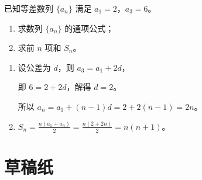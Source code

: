 \documentclass{exam-zh}
\begin{document}
\begin{problem}[points = 10]
  已知等差数列 $\{a_n\}$ 满足 $a_1 = 2$，$a_3 = 6$。

  \begin{enumerate}
    \item 求数列 $\{a_n\}$ 的通项公式；
    \item 求前 $n$ 项和 $S_n$。
  \end{enumerate}

  \begin{solution}
    \begin{enumerate}
      \item 设公差为 $d$，则 $a_3 = a_1 + 2d$，

      即 $6 = 2 + 2d$，解得 $d = 2$。

      所以 $a_n = a_1 + (n - 1)d = 2 + 2(n - 1) = 2n$。

      \item $S_n = \frac{n(a_1 + a_n)}{2} = \frac{n(2 + 2n)}{2} = n(n + 1)$。
    \end{enumerate}
  \end{solution}
\end{problem}


\newpage
\section*{草稿纸}

\draftpaper
\end{document}
